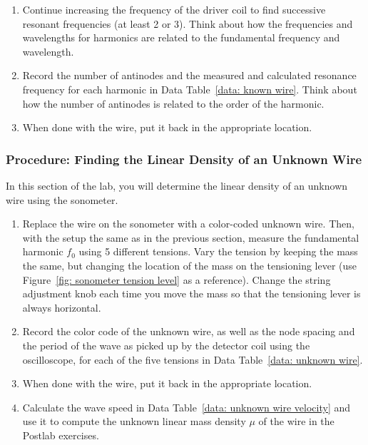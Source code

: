 \documentclass[addpoints]{physlabs}
\begin{document}
\begin{labsection}
\begin{experiment}
\begin{enumerate}
        \item Continue increasing the frequency of the driver coil to find successive resonant frequencies (at least 2 or 3). Think about how the frequencies and wavelengths for harmonics are related to the fundamental frequency and wavelength.

        \item Record the number of antinodes and the measured and calculated resonance frequency for each harmonic in Data Table~\ref{data: known wire}. Think about how the number of antinodes is related to the order of the harmonic.

        \item When done with the wire, put it back in the appropriate location.
    \end{enumerate}

    \subsubsection*{Procedure: Finding the Linear Density of an Unknown Wire}

    In this section of the lab, you will determine the linear density of an unknown wire using the sonometer.

    \begin{enumerate}
        \item Replace the wire on the sonometer with a color-coded unknown wire. Then, with the setup the same as in the previous section, measure the fundamental harmonic $f_0$ using 5 different tensions. Vary the tension by keeping the mass the same, but changing the location of the mass on the tensioning lever (use Figure~\ref{fig: sonometer tension level} as a reference). Change the string adjustment knob each time you move the mass so that the tensioning lever is always horizontal.

        \item Record the color code of the unknown wire, as well as the node spacing and the period of the wave as picked up by the detector coil using the oscilloscope, for each of the five tensions in Data Table~\ref{data: unknown wire}.

        \item When done with the wire, put it back in the appropriate location.

        \item Calculate the wave speed in Data Table~\ref{data: unknown wire velocity} and use it to compute the unknown linear mass density $\mu$ of the wire in the Postlab exercises.
    \end{enumerate}

\end{experiment}
\end{labsection}
\end{document}
